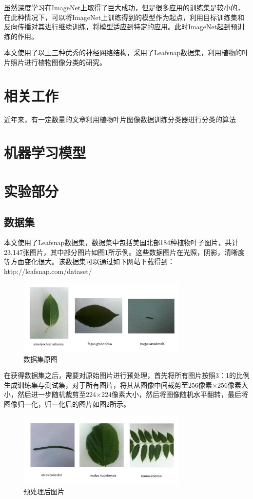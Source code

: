 \documentclass[a4paper]{ctexart} %
\begin{document}
虽然深度学习在ImageNet上取得了巨大成功，但是很多应用的训练集是较小的，在此种情况下，可以将ImageNet上训练得到的模型作为起点，利用目标训练集和反向传播对其进行继续训练，将模型适应到特定的应用。此时ImageNet起到预训练的作用。

本文使用了以上三种优秀的神经网络结构，采用了Leafsnap数据集，利用植物的叶片照片进行植物图像分类的研究。

\section*{相关工作}
近年来，有一定数量的文章利用植物叶片图像数据训练分类器进行分类的算法
\section*{机器学习模型}

\section*{实验部分}
\subsection*{数据集}
本文使用了Leafsnap\parencite{leafsnap}数据集，数据集中包括美国北部184种植物叶子图片，共计23,147张图片，其中部分图片如图1所示例。这些数据图片在光照，阴影，清晰度等方面变化很大。该数据集可以通过如下网站下载得到：http://leafsnap.com/dataset/
\begin{figure}[htbp]
	\centering
	\includegraphics[width=0.75\textwidth]{img1.png}
	\caption{数据集原图}
	\label{figure}
\end{figure}


在获得数据集之后，需要对原始图片进行预处理，首先将所有图片按照3：1的比例生成训练集与测试集，对于所有图片，将其从图像中间裁剪至256像素×256像素大小，然后进一步随机裁剪至224×224像素大小，然后将图像随机水平翻转，最后将图像归一化，归一化后的图片如图2所示。

\begin{figure}[htbp]
	\centering
	\includegraphics[width=0.75\textwidth]{img2.png}
	\caption{预处理后图片}
	\label{figure}
\end{figure}
\end{document}
